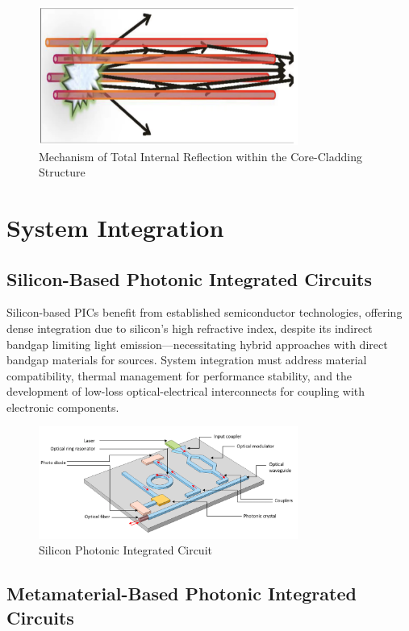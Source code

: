 \documentclass[10pt]{article}
\begin{document}
        \begin{figure}[h]
            \centering
            \includegraphics[width=8.5cm]{TotalInternal.png}
            \caption{Mechanism of Total Internal Reflection within the Core-Cladding Structure} 
            \end{figure}
        
        \section{System Integration}
        
\subsection{Silicon-Based Photonic Integrated Circuits}

Silicon-based PICs benefit from established semiconductor technologies, offering dense integration due to silicon's high refractive index, despite its indirect bandgap limiting light emission—necessitating hybrid approaches with direct bandgap materials for sources. System integration must address material compatibility, thermal management for performance stability, and the development of low-loss optical-electrical interconnects for coupling with electronic components.

\begin{figure}[h]
    \centering
    \includegraphics[width=8.5cm]{Silicon Photonic.png}
    \caption{Silicon Photonic Integrated Circuit} 
    \end{figure}

\subsection{Metamaterial-Based Photonic Integrated Circuits}
\end{document}
